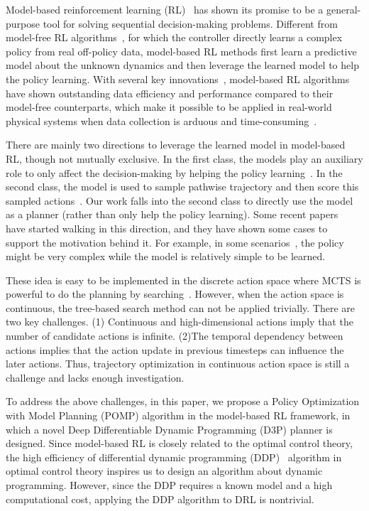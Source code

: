 \documentclass{article}
\newcommand{\lijun}[1]{ {#1}}
\newcommand{\revision}[1]{{#1}}
\begin{document}
Model-based reinforcement learning (RL)~ has shown its promise to be a general-purpose tool for solving sequential decision-making problems. 
Different from model-free RL algorithms~, for which the controller directly learns a complex policy from real off-policy data, model-based RL methods first learn a predictive model about the unknown dynamics  and then leverage the learned model to help the policy learning. 
With several key innovations~, model-based RL algorithms have shown outstanding data efficiency and performance compared to their model-free counterparts, which make it possible to be applied in real-world physical systems when data collection is arduous and time-consuming~.

\revision{There are mainly two directions to leverage the learned model in model-based RL, though not mutually exclusive. In the first class, the models   play an auxiliary role to only affect the decision-making by helping the policy learning~. In the second class, the model is used to sample pathwise trajectory and then score this sampled actions~. Our work falls into the second class to directly use the model as a planner (rather than only help the policy learning).
Some recent papers~ have started walking in this direction, and they have shown some cases to support the motivation behind it. For example, in some scenarios~, the policy might be very complex while the model is relatively simple to be learned.  } 

These idea is easy to be implemented in the discrete action space  where MCTS is powerful to do the planning by searching~.
However, when the action space is continuous, the tree-based search method can not be applied trivially. 
There are two key challenges. 
(1) Continuous and high-dimensional actions imply that the number of candidate actions is infinite. 
(2)The temporal dependency between actions implies that the action update in previous timesteps can influence the later actions. Thus, trajectory optimization in continuous action space is still a challenge and lacks enough investigation. 

To address the above challenges, in this paper, we propose a Policy Optimization with Model Planning (POMP) algorithm in the model-based RL framework, in which a novel Deep Differentiable Dynamic Programming (D3P) planner is designed.     \lijun{Since model-based RL is  closely related to the optimal control theory, the high efficiency of differential dynamic programming (DDP)~ algorithm in optimal control theory inspires us to design an algorithm about dynamic programming. However, since the DDP requires a known model and a high computational cost, applying the DDP  algorithm to DRL is nontrivial.}
\end{document}
